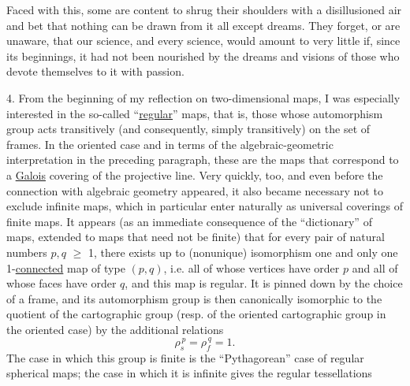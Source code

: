 
Faced with this, some are content to shrug their shoulders
with a disillusioned air and bet that nothing can be drawn
from it all except dreams. They forget, or are unaware,
that our science, and every science, would amount to very little
if, since its beginnings, it had not been nourished by the dreams and visions
of those who devote themselves to it with passion.

4.        From the beginning of my reflection on two-dimensional maps,
I was especially interested in the so-called
``\uline{regular}'' maps, that is, those whose automorphism group
acts transitively (and consequently, simply transitively)
on the set of frames. In the oriented case and in terms of
the algebraic-geometric interpretation in the preceding paragraph,
these are the maps that correspond to a \uline{Galois} covering of
the projective line. Very quickly, too, and even before the connection
with algebraic geometry appeared, it also became
necessary not to exclude infinite maps, which in particular enter
naturally as universal coverings of
finite maps. It appears (as an immediate consequence of the ``dictionary''
of maps, extended to maps that need not be finite)
that for every pair of natural numbers $p, q$ $\geq$ 1, there exists up to
(nonunique) isomorphism one and only one 1-\uline{connected} map
of type $(p,q)$, i.e. all of whose vertices have order $p$
and all of whose faces have order $q$, and this map is regular.
It is pinned down by the choice of a frame, and its
automorphism group is then canonically isomorphic to the quotient
of the cartographic group (resp. of the oriented cartographic
group in the oriented case) by the additional relations
\[ \rho_s^{\,p} = \rho_f^{\,q} = 1. \]
The case in which this group is finite is the ``Pythagorean'' case of
regular spherical maps; the case in which it is infinite gives the regular tessellations



